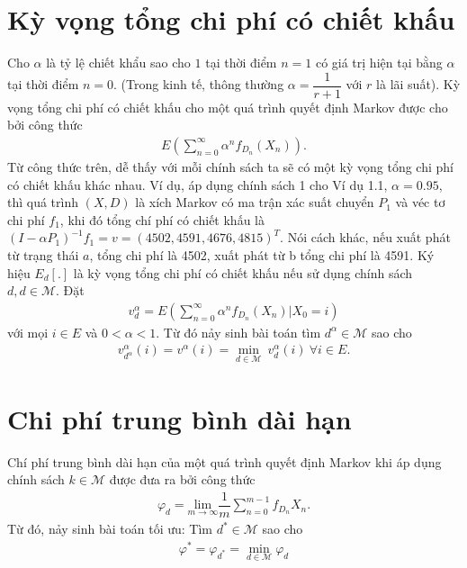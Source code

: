 \documentclass[12pt,a4paper]{report}
\begin{document}
    \section{Kỳ vọng tổng chi phí có chiết khấu}
    Cho $\alpha$ là tỷ lệ chiết khẩu sao cho $1$ tại thời điểm $n=1$ có giá trị hiện tại bằng $\alpha$ tại thời điểm $n=0$. (Trong kinh tế, thông thường $\alpha=\dfrac{1}{r+1}$ với $r$ là lãi suất). Kỳ vọng tổng chi phí có chiết khấu cho một quá trình quyết định Markov được cho bởi công thức 
    \begin{align*}
    E(\sum_{n=0}^{\infty}\alpha^n f_{D_n}(X_n)).
    \end{align*} 
   Từ công thức trên, dễ thấy với mỗi chính sách ta sẽ có một kỳ vọng tổng chi phí có chiết khấu khác nhau.
   Ví dụ, áp dụng chính sách 1 cho Ví dụ 1.1, $\alpha=0.95$, thì quá trình $(X,D)$ là xích Markov có ma trận xác suất chuyển $P_1$ và véc tơ chi phí $f_1$, khi đó tổng chí phí có chiết khấu là $(I-\alpha P_1)^{-1}f_1=v=(4502, 4591, 4676, 4815)^T$. Nói cách khác, nếu xuất phát từ trạng thái $a$, tổng chi phí là 4502, xuất phát từ b tổng chi phí là 4591.  Ký hiệu $E_d[.]$ là kỳ vọng tổng chi phí có chiết khấu nếu sử dụng chính sách $d, d \in \mathcal{M}$. Đặt
   \begin{align*}
   v^{\alpha}_d= E(\sum_{n=0}^{\infty}\alpha^n f_{D_n}(X_n)|X_0=i)
   \end{align*} 
   với mọi $i \in E$ và $0<\alpha<1$. Từ đó nảy sinh bài toán tìm $d^{\alpha} \in \mathcal{M}$ sao cho
   \begin{align}
    v^{\alpha}_{d^\alpha}(i)=v^{\alpha}(i)=\underset{d \in \mathcal{M}}{\min} \ v^{\alpha}_d(i) \ \forall i\in E.  
    \end{align}
    
    \section{Chi phí trung bình dài hạn}
    Chí phí trung bình dài hạn của một quá trình quyết định Markov khi áp dụng chính sách $k \in \mathcal{M}$ được đưa ra bởi công thức
    \begin{align*}
    \varphi_d=\underset{m \rightarrow \infty}{\mathrm{lim}}\dfrac{1}{m}\sum_{n=0}^{m-1}f_{D_n}X_n. 
    \end{align*}
    Từ đó, nảy sinh bài toán tối ưu: Tìm $d^* \in \mathcal{M}$ sao cho 
    \begin{align}
    \varphi^*=\varphi_{d^*}=\underset{d \in \mathcal{M}}{\min} \varphi_d
    \end{align}
\end{document}
